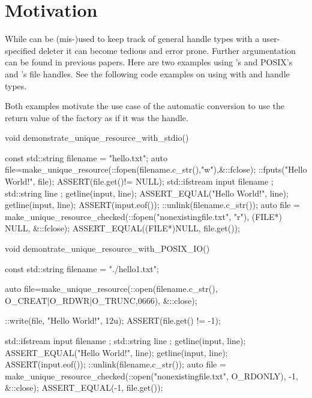 \documentclass[ebook,11pt,article]{memoir}
\begin{document}
\chapter{Motivation}
While  can be (mis-)used to keep track of general handle types with a user-specified deleter it can become tedious and error prone. Further argumentation can be found in previous papers. Here are two examples using  's  and POSIX's and 's  file handles. See the following code examples on using  with  and  handle types.

Both examples motivate the use case of the automatic conversion to use the return value of the factory as if it was the handle. 

\begin{codeblock}
void demonstrate_unique_resource_with_stdio() {
  const std::string filename = "hello.txt";
  {
    auto file=make_unique_resource(::fopen(filename.c_str(),"w"),&::fclose);
    ::fputs("Hello World!\n", file);
    ASSERT(file.get()!= NULL);
  }
  {
    std::ifstream input { filename };
    std::string line { };
    getline(input, line);
    ASSERT_EQUAL("Hello World!", line);
    getline(input, line);
    ASSERT(input.eof());
  }
  ::unlink(filename.c_str());
  {
    auto file = make_unique_resource_checked(::fopen("nonexistingfile.txt", "r"), 
                (FILE*) NULL, &::fclose);
    ASSERT_EQUAL((FILE*)NULL, file.get());
  }

}
\end{codeblock}

\newpage
\begin{codeblock}
void demontrate_unique_resource_with_POSIX_IO() {
  const std::string filename = "./hello1.txt";
  {
    auto file=make_unique_resource(::open(filename.c_str(),
                     O_CREAT|O_RDWR|O_TRUNC,0666), &::close);
    
    ::write(file, "Hello World!\n", 12u);
    ASSERT(file.get() != -1);
  }
  {
    std::ifstream input { filename };
    std::string line { };
    getline(input, line);
    ASSERT_EQUAL("Hello World!", line);
    getline(input, line);
    ASSERT(input.eof());
  }
  ::unlink(filename.c_str());
  {
    auto file = make_unique_resource_checked(::open("nonexistingfile.txt", 
                       O_RDONLY), -1, &::close);
    ASSERT_EQUAL(-1, file.get());
  }

}\end{codeblock}
\end{document}
